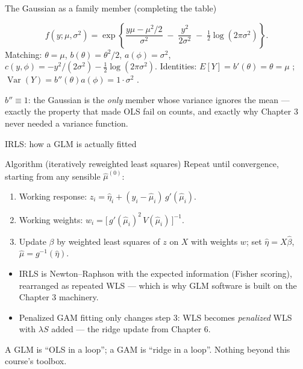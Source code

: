 \documentclass[aspectratio=169,11pt]{beamer}
\begin{document}
\begin{frame}{The Gaussian as a family member (completing the table)}
  \begin{numexample}
    \[
      f(y;\mu,\sigma^2)
      = \exp\!\left\{ \frac{y\mu - \mu^2/2}{\sigma^2}
        \;-\; \frac{y^2}{2\sigma^2} \;-\; \tfrac12\log(2\pi\sigma^2) \right\}.
    \]
    Matching: $\theta = \mu$, \; $b(\theta) = \theta^2/2$, \; $a(\phi) = \sigma^2$, \;
    $c(y,\phi) = -y^2/(2\sigma^2) - \tfrac12\log(2\pi\sigma^2)$.
    Identities: $E[Y] = b'(\theta) = \theta = \mu$ \checkmark;\;
    $\operatorname{Var}(Y) = b''(\theta)a(\phi) = 1\cdot\sigma^2$ \checkmark.
  \end{numexample}
  \begin{takeaway}
    $b'' \equiv 1$: the Gaussian is the \emph{only} member whose variance ignores the
    mean --- exactly the property that made OLS fail on counts, and exactly why
    Chapter 3 never needed a variance function.
  \end{takeaway}
\end{frame}

\begin{frame}{IRLS: how a GLM is actually fitted}
  \footnotesize
  \begin{block}{Algorithm (iteratively reweighted least squares)}
    Repeat until convergence, starting from any sensible $\hat\mu^{(0)}$:
    \begin{enumerate}
      \item Working response: \;
            $z_i = \hat\eta_i + (y_i - \hat\mu_i)\, g'(\hat\mu_i)$.
      \item Working weights: \;
            $w_i = \big[\, g'(\hat\mu_i)^2\, V(\hat\mu_i)\, \big]^{-1}$.
      \item Update $\beta$ by weighted least squares of $z$ on $X$ with weights $w$;
            set $\hat\eta = X\hat\beta$, $\hat\mu = g^{-1}(\hat\eta)$.
    \end{enumerate}
  \end{block}
  \begin{readme}
    \begin{itemize}
      \item IRLS is Newton--Raphson with the expected information (Fisher scoring),
            rearranged as repeated WLS --- which is why GLM software is built on the
            Chapter 3 machinery.
      \item Penalized GAM fitting only changes step 3: WLS becomes \emph{penalized}
            WLS with $\lambda S$ added --- the ridge update from Chapter 6.
    \end{itemize}
  \end{readme}
  \begin{takeaway}
    A GLM is ``OLS in a loop''; a GAM is ``ridge in a loop''. Nothing beyond this
    course's toolbox.
  \end{takeaway}
\end{frame}
\end{document}
